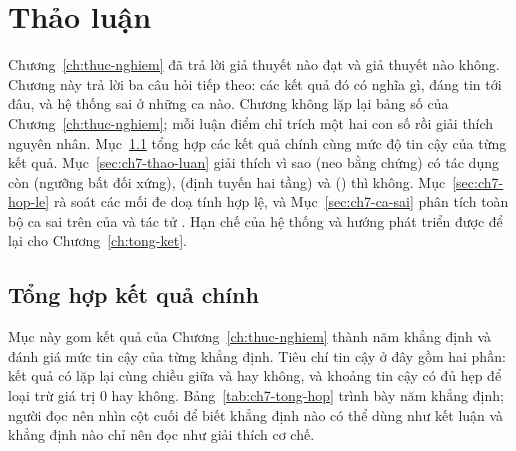 
\section{Thảo luận}
\label{ch:thao-luan}

Chương~\ref{ch:thuc-nghiem} đã trả lời giả thuyết nào đạt và giả thuyết nào không. Chương này trả lời ba câu hỏi tiếp theo: các kết quả đó có nghĩa gì, đáng tin tới đâu, và hệ thống sai ở những ca nào. Chương không lặp lại bảng số của Chương~\ref{ch:thuc-nghiem}; mỗi luận điểm chỉ trích một hai con số rồi giải thích nguyên nhân. Mục~\ref{sec:ch7-tong-hop} tổng hợp các kết quả chính cùng mức độ tin cậy của từng kết quả. Mục~\ref{sec:ch7-thao-luan} giải thích vì sao  (neo bằng chứng) có tác dụng còn  (ngưỡng bất đối xứng),  (định tuyến hai tầng) và  () thì không. Mục~\ref{sec:ch7-hop-le} rà soát các mối đe doạ tính hợp lệ, và Mục~\ref{sec:ch7-ca-sai} phân tích toàn bộ ca sai trên  của \CTAV{} và tác tử . Hạn chế của hệ thống và hướng phát triển được để lại cho Chương~\ref{ch:tong-ket}.

\subsection{Tổng hợp kết quả chính}
\label{sec:ch7-tong-hop}

Mục này gom kết quả của Chương~\ref{ch:thuc-nghiem} thành năm khẳng định và đánh giá mức tin cậy của từng khẳng định. Tiêu chí tin cậy ở đây gồm hai phần: kết quả có lặp lại cùng chiều giữa  và  hay không, và khoảng tin cậy có đủ hẹp để loại trừ giá trị $0$ hay không. Bảng~\ref{tab:ch7-tong-hop} trình bày năm khẳng định; người đọc nên nhìn cột cuối để biết khẳng định nào có thể dùng như kết luận và khẳng định nào chỉ nên đọc như giải thích cơ chế.

